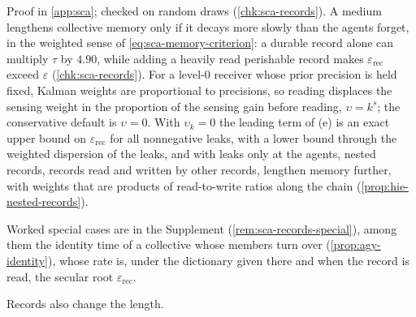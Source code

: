 Proof in \cref{app:sca}; checked on random draws (\cref{chk:sca-records}). A medium lengthens collective memory only if it decays more slowly than the agents forget, in the weighted sense of \eqref{eq:sca-memory-criterion}: a durable record alone can multiply $\tau$ by $4.90$, while adding a heavily read perishable record makes $\varepsilon_{\mathrm{rec}}$ exceed $\varepsilon$ (\cref{chk:sca-records}). For a level-0 receiver whose prior precision is held fixed, Kalman weights are proportional to precisions, so reading displaces the sensing weight in the proportion of the sensing gain before reading, $\upsilon=k^s$; the conservative default is $\upsilon=0$. With $\upsilon_k=0$ the leading term of (e) is an exact upper bound on $\varepsilon_{\mathrm{rec}}$ for all nonnegative leaks, with a lower bound through the weighted dispersion of the leaks, and with leaks only at the agents, nested records, records read and written by other records, lengthen memory further, with weights that are products of read-to-write ratios along the chain (\cref{prop:hie-nested-records}).

Worked special cases are in the Supplement (\cref{rem:sca-records-special}), among them the identity time of a collective whose members turn over (\cref{prop:agy-identity}), whose rate is, under the dictionary given there and when the record is read, the secular root $\varepsilon_{\mathrm{rec}}$.

Records also change the length.

